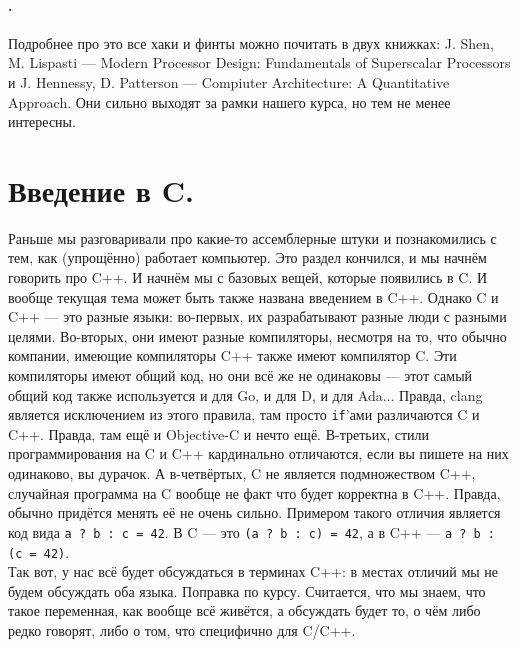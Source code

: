 \documentclass{article}
\begin{document}
    \paragraph{.}
    Подробнее про это все хаки и финты можно почитать в двух книжках: J. Shen, M. Lispasti --- Modern Processor Design: Fundamentals of Superscalar Processors и J. Hennessy, D. Patterson --- Compiuter Architecture: A Quantitative Approach. Они сильно выходят за рамки нашего курса, но тем не менее интересны.
    \section{Введение в C.}
    Раньше мы разговаривали про какие-то ассемблерные штуки и познакомились с тем, как (упрощённо) работает компьютер. Это раздел кончился, и мы начнём говорить про C++. И начнём мы с базовых вещей, которые появились в C. И вообще текущая тема может быть также названа введением в C++. Однако C и C++ --- это разные языки: во-первых, их разрабатывают разные люди с разными целями. Во-вторых, они имеют разные компиляторы, несмотря на то, что обычно компании, имеющие компиляторы C++ также имеют компилятор C. Эти компиляторы имеют общий код, но они всё же не одинаковы --- этот самый общий код также используется и для Go, и для D, и для Ada... Правда, clang является исключением из этого правила, там просто \texttt{if}'ами различаются C и C++. Правда, там ещё и Objective-C и нечто ещё. В-третьих, стили программирования на C и C++ кардинально отличаются, если вы пишете на них одинаково, вы дурачок. А в-четвёртых, C не является подмножеством C++, случайная программа на C вообще не факт что будет корректна в C++. Правда, обычно придётся менять её не очень сильно. Примером такого отличия является код вида \texttt{a ? b : c = 42}. В C --- это \texttt{(a ? b : c) = 42}, а в C++ --- \texttt{a ? b : (c = 42)}.\\
    Так вот, у нас всё будет обсуждаться в терминах C++: в местах отличий мы не будем обсуждать оба языка. Поправка по курсу. Считается, что мы знаем, что такое переменная, как вообще всё живётся, а обсуждать будет то, о чём либо редко говорят, либо о том, что специфично для C/C++.
\end{document}
